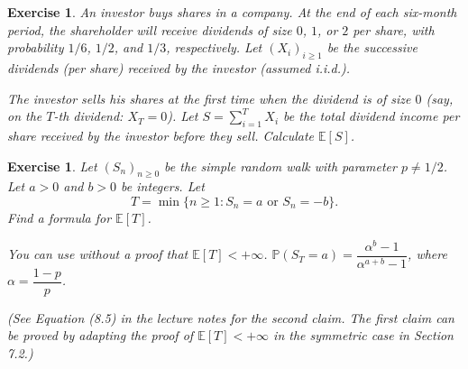 \documentclass{article}
\newtheorem{exercise}[theorem]{Exercise}
\begin{document}
\begin{exercise}
An investor buys shares in a company. At the end of each six-month period, the shareholder will receive dividends of size $0$, $1$, or $2$ per share, with probability $1/6$, $1/2$, and $1/3$, respectively. Let $(X_i)_{i \geq 1}$ be the successive dividends (per share) received by the investor (assumed i.i.d.).

\medskip

The investor sells his shares at the first time when the dividend is of size $0$ (say, on the $T$-th dividend: $X_T = 0$). Let $S = \sum_{i=1}^{T} X_i$ be the total dividend income per share received by the investor before they sell. Calculate $\mathbb{E}[S]$.
\end{exercise}

\begin{exercise}
Let $(S_n)_{n \geq 0}$ be the simple random walk with parameter $p \neq 1/2$. Let $a > 0$ and $b > 0$ be integers. Let 
\[
T = \min\{n \geq 1 : S_n = a \text{ or } S_n = -b\}.
\]
Find a formula for $\mathbb{E}[T]$.

\medskip

\textit{You can use without a proof that $\mathbb{E}[T] < +\infty$. $\mathbb{P}(S_T = a) = \dfrac{\alpha^b - 1}{\alpha^{a+b} - 1}$, where $\alpha = \dfrac{1 - p}{p}$.}

\textit{(See Equation (8.5) in the lecture notes for the second claim. The first claim can be proved by adapting the proof of $\mathbb{E}[T] < +\infty$ in the symmetric case in Section 7.2.)}

\end{exercise}
\end{document}
